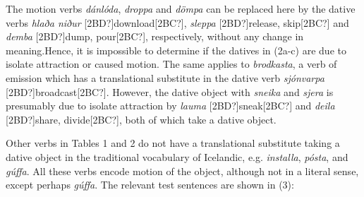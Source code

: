 \begin{styleStandard}
The motion verbs \textit{dánlóda}, \textit{droppa} and \textit{dömpa} can be replaced here by the dative verbs \textit{hlaða niður }[2BD?]download[2BC?], \textit{sleppa} [2BD?]release, skip[2BC?] and \textit{demba }[2BD?]dump, pour[2BC?], respectively, without any change in meaning.\textstyleFootnoteSymbol{ }Hence, it is impossible to determine if the datives in (2a-c) are due to isolate attraction or caused motion. The same applies to \textit{brodkasta}, a verb of emission which has a translational substitute in the dative verb \textit{sjónvarpa }[2BD?]broadcast[2BC?]. However, the dative object with \textit{sneika} and \textit{sjera }is presumably due\textit{ }to isolate attraction by \textit{lauma} [2BD?]sneak[2BC?] and \textit{deila }[2BD?]share, divide[2BC?], both of which take a dative object.
\end{styleStandard}

\begin{styleStandard}
Other verbs in Tables 1 and 2 do not have a translational substitute taking a dative object in the traditional vocabulary of Icelandic, e.g. \textit{installa},\textit{ pósta}, and \textit{gúffa}. All these verbs encode motion of the object, although not in a literal sense, except perhaps \textit{gúffa}. The relevant test sentences are shown in (3): 
\end{styleStandard}


